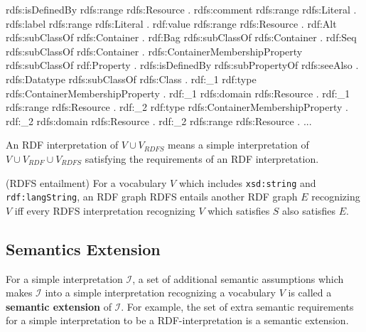 \documentclass{article}
\begin{document}
\begin{defin}
{rdfs:isDefinedBy rdfs:range rdfs:Resource .\newline
rdfs:comment rdfs:range rdfs:Literal .\newline
rdfs:label rdfs:range rdfs:Literal .\newline
rdf:value rdfs:range rdfs:Resource . \newline
\newline
rdf:Alt rdfs:subClassOf rdfs:Container . \newline
rdf:Bag rdfs:subClassOf rdfs:Container . \newline
rdf:Seq rdfs:subClassOf rdfs:Container . \newline
rdfs:ContainerMembershipProperty rdfs:subClassOf rdf:Property . \newline
\newline
rdfs:isDefinedBy rdfs:subPropertyOf rdfs:seeAlso . \newline
\newline
rdfs:Datatype rdfs:subClassOf rdfs:Class . \newline
\newline
rdf:\_1 rdf:type rdfs:ContainerMembershipProperty . \newline
rdf:\_1 rdfs:domain rdfs:Resource . \newline
rdf:\_1 rdfs:range rdfs:Resource . \newline 
rdf:\_2 rdf:type rdfs:ContainerMembershipProperty . \newline
rdf:\_2 rdfs:domain rdfs:Resource . \newline
rdf:\_2 rdfs:range rdfs:Resource .  \newline
... 
}
\end{defin}

\noindent An RDF interpretation of $V \cup V_{RDFS}$ means a simple interpretation of $V \cup V_{RDF} \cup V_{RDFS}$ satisfying the requirements of an RDF interpretation. 

\begin{defin}(RDFS entailment)\newline
For a vocabulary $V$ which includes \texttt{xsd:string} and \texttt{rdf:langString}, an RDF graph RDFS entails another RDF graph $E$ recognizing $V$ iff every RDFS interpretation recognizing $V$ which satisfies $S$ also satisfies $E$.

\end{defin}

\subsection{Semantics Extension}
For a simple interpretation $\mathcal{I}$, a set of additional semantic assumptions which makes $\mathcal{I} $ into a simple interpretation recognizing a vocabulary $V$ is called a \textbf{semantic extension} of $\mathcal{I}$. For example, the set of extra semantic requirements for a simple interpretation to be a RDF-interpretation is a semantic extension.\newline
\end{document}
